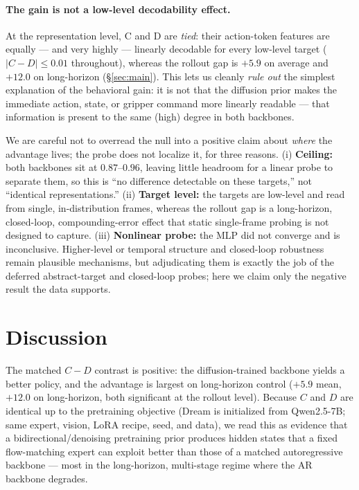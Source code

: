 \documentclass[conference]{IEEEtran}
\begin{document}
\paragraph{The gain is not a low-level decodability effect.} At the representation
level, C and D are \emph{tied}: their action-token features are equally --- and
very highly --- linearly decodable for every low-level target ($|C-D|\le0.01$
throughout), whereas the rollout gap is $+5.9$ on average and $+12.0$ on
long-horizon (\S\ref{sec:main}). This lets us cleanly \emph{rule out} the simplest
explanation of the behavioral gain: it is not that the diffusion prior makes the
immediate action, state, or gripper command more linearly readable --- that
information is present to the same (high) degree in both backbones.

We are careful not to overread the null into a positive claim about \emph{where}
the advantage lives; the probe does not localize it, for three reasons. (i)
\textbf{Ceiling:} both backbones sit at $0.87$--$0.96$, leaving little headroom for
a linear probe to separate them, so this is ``no difference detectable on these
targets,'' not ``identical representations.'' (ii) \textbf{Target level:} the
targets are low-level and read from single, in-distribution frames, whereas the
rollout gap is a long-horizon, closed-loop, compounding-error effect that static
single-frame probing is not designed to capture. (iii) \textbf{Nonlinear probe:}
the MLP did not converge and is inconclusive. Higher-level or temporal structure
and closed-loop robustness remain plausible mechanisms, but adjudicating them is
exactly the job of the deferred abstract-target and closed-loop probes; here we
claim only the negative result the data supports.

\section{Discussion}

The matched $C-D$ contrast is positive: the diffusion-trained backbone yields a
better policy, and the advantage is largest on long-horizon control
($+5.9$ mean, $+12.0$ on long-horizon, both significant at the rollout level). Because $C$ and $D$ are identical up to
the pretraining objective (Dream is initialized from Qwen2.5-7B; same expert,
vision, LoRA recipe, seed, and data), we read this as evidence that a
bidirectional/denoising pretraining prior produces hidden states that a fixed
flow-matching expert can exploit better than those of a matched autoregressive
backbone --- most in the long-horizon, multi-stage regime where the AR backbone
degrades.
\end{document}
